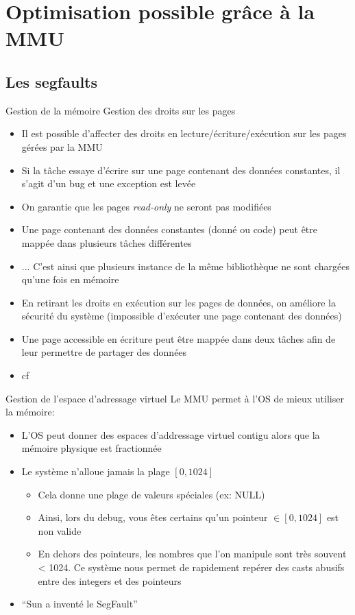 \section{Optimisation possible grâce à la MMU}

\subsection{Les segfaults}

\begin{frame}{Gestion de la mémoire}
  Gestion des droits sur les pages
  \begin{itemize}
  \item    Il    est     possible    d'affecter    des    droits    en
    lecture/écriture/exécution sur les pages gérées par la MMU
  \item Si la tâche essaye d'écrire sur une page contenant des données
    constantes, il s'agit d'un bug et une exception est levée
  \item  On garantie  que  les pages  \emph{read-only}  ne seront  pas
    modifiées
  \item Une page contenant des données constantes (donné ou code) peut
    être mappée dans plusieurs tâches différentes
  \item ... C'est ainsi que plusieurs instance de la même bibliothèque
    ne sont chargées qu'une fois en mémoire
  \item En retirant les droits  en exécution sur les pages de données,
    on améliore la sécurité du système (impossible d'exécuter une page
    contenant des données)
  \item Une  page accessible  en écriture peut  être mappée  dans deux
    tâches afin de leur permettre de partager des données
  \item cf 
  \end{itemize}
\end{frame}

\begin{frame}{Gestion de l'espace d'adressage virtuel}
  Le MMU permet à l'OS de mieux utiliser la mémoire:
  \begin{itemize}
  \item  L'OS peut  donner  des espaces  d'addressage virtuel  contigu
    alors que la mémoire physique est fractionnée
  \item Le système n'alloue jamais la plage $[0, 1024]$
    \begin{itemize}
    \item Cela donne une plage de valeurs spéciales (ex: NULL)
    \item Ainsi, lors du debug, vous êtes certains qu'un pointeur $\in
      [0, 1024]$ est non valide
    \item En dehors des pointeurs,  les nombres que l'on manipule sont
      très  souvent <  1024.   Ce système  nous  permet de  rapidement
      repérer des casts abusifs entre des integers et des pointeurs
    \end{itemize}
  \item ``Sun a inventé le SegFault''
  \end{itemize}
\end{frame}

